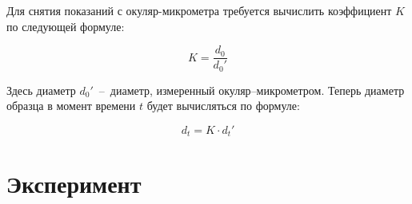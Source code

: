 \documentclass[12pt, a4paper]{article}
\begin{document}
    Для снятия показаний с окуляр-микрометра требуется вычислить коэффициент $K$ по следующей формуле:
    
    \begin{equation}
        K = \frac{d_{0}}{d_{0}'}
        \label{eq5}
    \end{equation}
    
    Здесь диаметр $d_{0}'$~--~диаметр, измеренный окуляр–микрометром. Теперь диаметр образца в момент времени $t$ будет вычисляться по формуле:
    
    \begin{equation}
        d_{t} = K \cdot d_{t}'
        \label{eq6}
    \end{equation}
    
    \section{Эксперимент}
    
\end{document}
